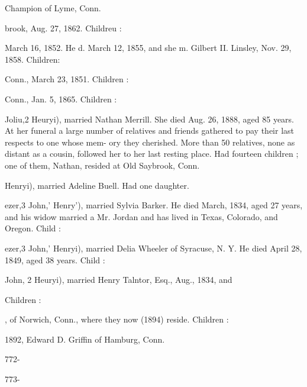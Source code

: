 \documentclass{book}
\begin{document}
Champion of Lyme, Conn. 


brook, Aug. 27, 1862. Childreu : 








March 16, 1852. He d. March 12, 1855, and she m. Gilbert II. 
Linsley, Nov. 29, 1858. Children: 














Conn., March 23, 1851. Children : 




Conn., Jan. 5, 1865. Children : 








Joliu,2 Heuryi), married Nathan Merrill. She died Aug. 26, 
1888, aged 85 years. At her funeral a large number of relatives 
and friends gathered to pay their last respects to one whose mem- 
ory they cherished. More than 50 relatives, none as distant as 
a cousin, followed her to her last resting place. Had fourteen 
children ; one of them, Nathan, resided at Old Saybrook, Conn. 

Henryi), married Adeline Buell. Had one daughter. 


ezer,3 John,' Henry'), married Sylvia Barker. He died March, 
1834, aged 27 years, and his widow married a Mr. Jordan and 
has lived in Texas, Colorado, and Oregon. Child : 


ezer,3 John,' Henryi), married Delia Wheeler of Syracuse, N. Y. 
He died April 28, 1849, aged 38 years. Child : 


John, 2 Heuryi), married Henry Talntor, Esq., Aug., 1834, and 

Children : 






, of Norwich, Conn., where they now (1894) reside. Children : 


1892, Edward D. Griffin of Hamburg, Conn. 







772- 




773- 
\end{document}
